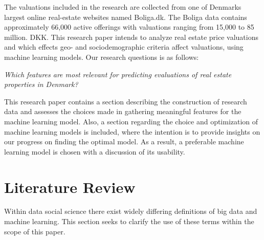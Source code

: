 \documentclass[12pt,a4paper]{article}
\begin{document}
The valuations included in the research are collected from one of Denmarks largest online real-estate websites named Boliga.dk. The Boliga data contains approximately 66,000 active offerings with valuations ranging from 15,000 to 85 million. DKK. This research paper intends to analyze real estate price valuations and which effects geo- and sociodemographic criteria affect valuations, using machine learning models. Our research questions is as follows: 
\begin{center}
 \textit{Which features are most relevant for predicting evaluations of real estate properties in Denmark?}
\end{center}
This research paper contains a section describing the construction of research data and assesses the choices made in gathering meaningful features for the machine learning model. Also, a section regarding the choice and optimization of machine learning models is included, where the intention is to provide insights on our progress on finding the optimal model. As a result, a preferable machine learning model is chosen with a discussion of its usability. 

\section{Literature Review}
Within data social science there exist widely differing definitions of big data and machine learning. This section seeks to clarify the use of these terms within the scope of this paper.
\end{document}
